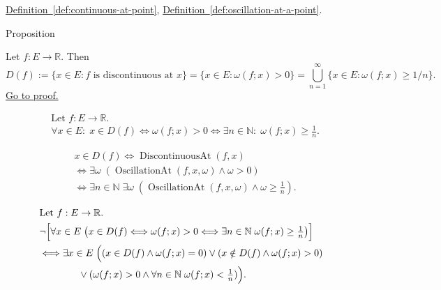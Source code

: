 \begin{dependencies}
\hyperref[def:continuous-at-point]{Definition~\ref*{def:continuous-at-point}},
\hyperref[def:oscillation-at-a-point]{Definition~\ref*{def:oscillation-at-a-point}}.
\end{dependencies}


\begin{propositionbox}{Proposition}
\begin{proposition}
\label{prop:discontinuity-set-via-oscillation}
Let $f:E\to\mathbb{R}$. Then
\[
D(f):=\{x\in E: f \text{ is discontinuous at } x\}
=\{x\in E: \omega(f;x)>0\}
=\bigcup_{n=1}^{\infty} \{x\in E: \omega(f;x)\ge 1/n\}.
\]
\hyperref[prf:discontinuity-set-via-oscillation]{Go to proof.}
\end{proposition}
\end{propositionbox}

\begin{remark*}
\[
\begin{aligned}
&\text{Let } f:E\to\mathbb{R}.\\
&\forall x\in E:\;
x\in D(f)
\Longleftrightarrow \omega(f;x)>0
\Longleftrightarrow
\exists n\in\mathbb{N}:\; \omega(f;x)\ge \tfrac1n.
\end{aligned}
\]
\end{remark*}

\begin{remark*}
\[
\begin{aligned}
&x\in D(f)
\Longleftrightarrow
\operatorname{DiscontinuousAt}(f,x)\\
&\Longleftrightarrow
\exists \omega\;(\operatorname{OscillationAt}(f,x,\omega)\land \omega>0)\\
&\Longleftrightarrow
\exists n\in\mathbb{N}\;\exists \omega\;(\operatorname{OscillationAt}(f,x,\omega)\land \omega\ge \tfrac1n).
\end{aligned}
\]
\end{remark*}

\begin{remark*}
\[
\begin{aligned}
&\text{Let } f:E\to\mathbb{R}.\\
&\neg\Bigl[\forall x\in E\;\bigl(x\in D(f)\Longleftrightarrow \omega(f;x)>0 \Longleftrightarrow \exists n\in\mathbb{N}\; \omega(f;x)\ge \tfrac1n\bigr)\Bigr]\\
&\Longleftrightarrow \exists x\in E\;\Bigl((x\in D(f)\land \omega(f;x)=0)\lor(x\notin D(f)\land \omega(f;x)>0)\\
&\qquad\qquad\lor(\omega(f;x)>0\land \forall n\in\mathbb{N}\; \omega(f;x)<\tfrac1n)\Bigr).
\end{aligned}
\]
\end{remark*}


